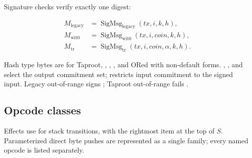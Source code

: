 Signature checks verify exactly one digest:

\[
\begin{aligned}
  M_{\mathrm{legacy}} &= \operatorname{SigMsg}_{\mathrm{legacy}}(tx,i,k,h),\\
  M_{\mathrm{wit0}} &= \operatorname{SigMsg}_{\mathrm{wit0}}(tx,i,coin,k,h),\\
  M_{\mathrm{tr}} &= \operatorname{SigMsg}_{\mathrm{tr}}(tx,i,coin,\alpha,k,h).
\end{aligned}
\]

Hash type bytes are   for Taproot,
 ,  , 
, and   ORed with non-default
forms. , , and  select the output commitment
set;  restricts input commitment to the signed input.
Legacy out-of-range  signs ; Taproot
out-of-range  fails \cite{bip-0143,bip-0341,bip-0342}.

\subsection{Opcode classes}

Effects use  for stack transitions, with the rightmost
item at the top of \(S\). Parameterized direct byte pushes are represented as a
single family; every named opcode is listed separately.

